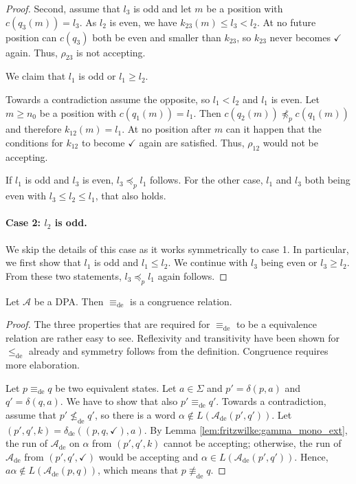 \begin{proof}
	Second, assume that $l_3$ is odd and let $m$ be a position with $c(q_3(m)) = l_3$. As $l_2$ is even, we have $k_{23}(m) \leq l_3 < l_2$. At no future position can $c(q_3)$ both be even and smaller than $k_{23}$, so $k_{23}$ never becomes $\checkmark$ again. Thus, $\rho_{23}$ is not accepting.
	
	We claim that $l_1$ is odd or $l_1 \geq l_2$.
	
	Towards a contradiction assume the opposite, so $l_1 < l_2$ and $l_1$ is even. Let $m \geq n_0$ be a position with $c(q_1(m)) = l_1$. Then $c(q_2(m)) \not\preceq_p c(q_1(m))$ and therefore $k_{12}(m) = l_1$. At no position after $m$ can it happen that the conditions for $k_{12}$ to become $\checkmark$ again are satisfied. Thus, $\rho_{12}$ would not be accepting.
	
	If $l_1$ is odd and $l_3$ is even, $l_3 \preceq_p l_1$ follows. For the other case, $l_1$ and $l_3$ both being even with $l_3 \leq l_2 \leq l_1$, that also holds.
	
	\paragraph{Case 2: $l_2$ is odd.} We skip the details of this case as it works symmetrically to case 1. In particular, we first show that $l_1$ is odd and $l_1 \leq l_2$. We continue with $l_3$ being even or $l_3 \geq l_2$. From these two statements, $l_3 \preceq_p l_1$ again follows.
\end{proof}

\begin{theorem}
	Let $\mathcal{A}$ be a DPA. Then $\equiv_\text{de}$ is a congruence relation.
\end{theorem}

\begin{proof}
	The three properties that are required for $\equiv_\text{de}$ to be a equivalence relation are rather easy to see. Reflexivity and transitivity have been shown for $\leq_\text{de}$ already and symmetry follows from the definition. Congruence requires more elaboration.

	Let $p \equiv_\text{de} q$ be two equivalent states. Let $a \in \Sigma$ and $p' = \delta(p, a)$ and $q' = \delta(q, a)$. We have to show that also $p' \equiv_\text{de} q'$. Towards a contradiction, assume that $p' \not\leq_\text{de} q'$, so there is a word $\alpha \notin L(\mathcal{A}_\text{de}(p', q'))$. Let $(p', q', k) = \delta_\text{de}((p, q, \checkmark), a)$. By Lemma \ref{lem:fritzwilke:gamma_mono_ext}, the run of $\mathcal{A}_\text{de}$ on $\alpha$ from $(p', q', k)$ cannot be accepting; otherwise, the run of $\mathcal{A}_\text{de}$ from $(p', q', \checkmark)$ would be accepting and $\alpha \in L(\mathcal{A}_\text{de}(p', q'))$. Hence, $a \alpha \notin L(\mathcal{A}_\text{de}(p, q))$, which means that $p \not\equiv_\text{de} q$.
\end{proof}

